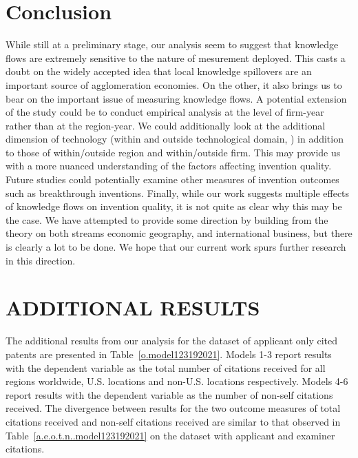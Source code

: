 \documentclass[12pt,letterpaper]{article}
\begin{document}
\section*{Conclusion}
While still at a preliminary stage, our analysis seem to suggest that knowledge flows are extremely sensitive to the nature of mesurement deployed. This casts a doubt on the widely accepted idea that local knowledge spillovers are an important source of agglomeration economies. On the other, it also brings us to bear on the important issue of measuring knowledge flows. A potential extension of the study could be to conduct empirical analysis at the level of firm-year rather than at the region-year. We could additionally look at the additional dimension of technology (within and outside technological domain, \cite{Rosenkopf2001}) in addition to those of within/outside region and within/outside firm. This may provide us with a more nuanced understanding of the factors affecting invention quality. Future studies could potentially examine other measures of invention outcomes such as breakthrough inventions. Finally, while our work suggests multiple effects of knowledge flows on invention quality, it is not quite as clear why this may be the case. We have attempted to provide some direction by building from the theory on both streams economic geography, and international business, but there is clearly a lot to be done. We hope that our current work spurs further research in this direction.  

\renewcommand{\refname}{REFERENCES}
\singlespacing
 

\newpage

\appendix

\section{ADDITIONAL RESULTS}


%



%

The additional results from our analysis for the dataset of applicant only cited patents are presented in Table~\ref{o.model123192021}. Models 1-3 report results with the dependent variable as the total number of citations received for all regions worldwide, U.S. locations and non-U.S. locations respectively. Models 4-6 report results with the dependent variable as the number of non-self citations received. The divergence between results for the two outcome measures of total citations received and non-self citations received are similar to that observed in Table~\ref{a.e.o.t.n..model123192021} on the dataset with applicant and examiner citations. \par
\end{document}

